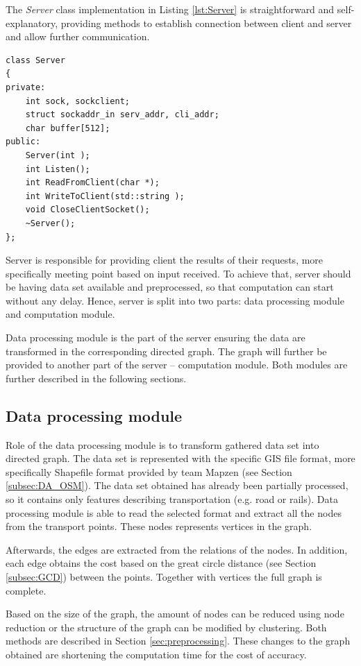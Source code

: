\documentclass[thesis=M,english]{FITthesis}[2012/10/20]
\begin{document}
The \textit{Server} class implementation in Listing \ref{lst:Server} is straightforward and self-explanatory, providing methods to establish connection between client and server and allow further communication.

\begin{lstlisting}[frame=single, caption={\texttt{Server} class}, label={lst:Server}]
class Server
{
private:
    int sock, sockclient;
	struct sockaddr_in serv_addr, cli_addr;
    char buffer[512];
public:
    Server(int );
    int Listen();
    int ReadFromClient(char *);
    int WriteToClient(std::string );
    void CloseClientSocket();
    ~Server();
};
\end{lstlisting}

Server is responsible for providing client the results of their requests, more specifically meeting point based on input received. To achieve that, server should be having data set available and preprocessed, so that computation can start without any delay. Hence, server is split into two parts: data processing module and computation module.

Data processing module is the part of the server ensuring the data are transformed in the corresponding directed graph. The graph will further be provided to another part of the server -- computation module. Both modules are further described in the following sections.


\subsection{Data processing module}
\label{subsec:dataprocessing} 
Role of the data processing module is to transform gathered data set into directed graph. The data set is represented with the specific GIS file format, more specifically Shapefile format provided by team Mapzen (see Section \ref{subsec:DA_OSM}). The data set obtained has already been partially processed, so it contains only features describing transportation (e.g. road or rails). Data processing module is able to read the selected format and extract all the nodes from the transport points. These nodes represents vertices in the graph. 

Afterwards, the edges are extracted from the relations of the nodes. In addition, each edge obtains the cost based on the great circle distance (see Section \ref{subsec:GCD}) between the points. Together with vertices the full graph is complete.

Based on the size of the graph, the amount of nodes can be reduced using node reduction or the structure of the graph can be modified by clustering. Both methods are described in Section \ref{sec:preprocessing}. These changes to the graph obtained are shortening the computation time for the cost of accuracy.
\end{document}
